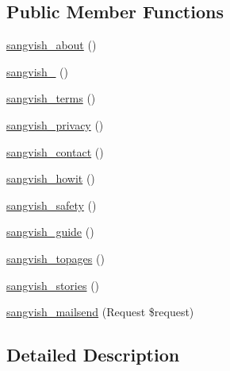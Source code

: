 \subsection*{Public Member Functions}
\begin{DoxyCompactItemize}
\item 
\mbox{\hyperlink{class_responsive_1_1_http_1_1_controllers_1_1_page_controller_a9370ff7b65dd39229439eac305eb35bb}{sangvish\+\_\+about}} ()
\item 
\mbox{\hyperlink{class_responsive_1_1_http_1_1_controllers_1_1_page_controller_a4c87941a5035ca67dde994ac05005930}{sangvish\+\_}} ()
\item 
\mbox{\hyperlink{class_responsive_1_1_http_1_1_controllers_1_1_page_controller_abe44a85c7579fe400be7cb6153b0e088}{sangvish\+\_\+terms}} ()
\item 
\mbox{\hyperlink{class_responsive_1_1_http_1_1_controllers_1_1_page_controller_a583662bcc0643b1dd4558cf9a4f1370f}{sangvish\+\_\+privacy}} ()
\item 
\mbox{\hyperlink{class_responsive_1_1_http_1_1_controllers_1_1_page_controller_adf6280461dd078b7dc477df314258279}{sangvish\+\_\+contact}} ()
\item 
\mbox{\hyperlink{class_responsive_1_1_http_1_1_controllers_1_1_page_controller_a60b40c392d4702528efca5ddcba82fed}{sangvish\+\_\+howit}} ()
\item 
\mbox{\hyperlink{class_responsive_1_1_http_1_1_controllers_1_1_page_controller_a59d70f0da3d4ec506186e414debdde16}{sangvish\+\_\+safety}} ()
\item 
\mbox{\hyperlink{class_responsive_1_1_http_1_1_controllers_1_1_page_controller_a9a336d720d76f207d96caf26ba6dfad1}{sangvish\+\_\+guide}} ()
\item 
\mbox{\hyperlink{class_responsive_1_1_http_1_1_controllers_1_1_page_controller_a1b00813bd52ff012b7bba02e4610e7bb}{sangvish\+\_\+topages}} ()
\item 
\mbox{\hyperlink{class_responsive_1_1_http_1_1_controllers_1_1_page_controller_a8f0d936ee5e2c7ed629083490acc2220}{sangvish\+\_\+stories}} ()
\item 
\mbox{\hyperlink{class_responsive_1_1_http_1_1_controllers_1_1_page_controller_a71eea67654a78d7c904fbd54a099a055}{sangvish\+\_\+mailsend}} (Request \$request)
\end{DoxyCompactItemize}


\subsection{Detailed Description}


